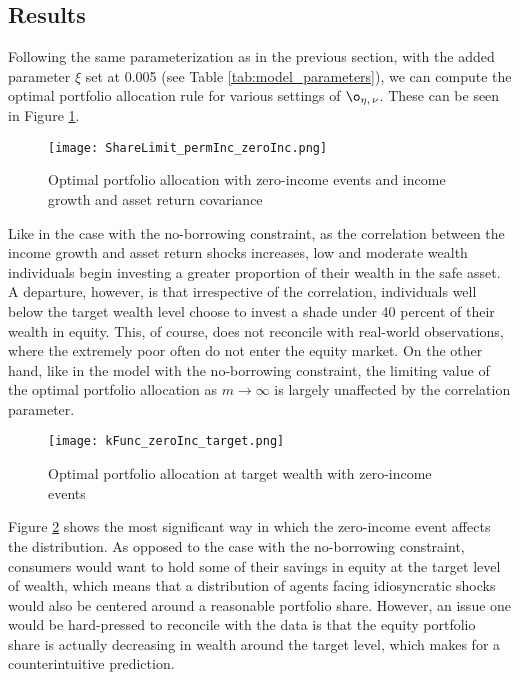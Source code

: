 \subsection{Results}

Following the same parameterization as in the previous section, with the added parameter $\xi$ set at 0.005 (see Table \ref{tab:model_parameters}), we can compute the optimal portfolio allocation rule for various settings of $\o_{\eta,\,\nu}$. These can be seen in Figure \ref{fig:zeroInc_shareLimit}.

\begin{figure}[h]
    \centering
    \texttt{[image: ShareLimit\_permInc\_zeroInc.png]}
    \caption{Optimal portfolio allocation with zero-income events and income growth and asset return covariance}
    \label{fig:zeroInc_shareLimit}
\end{figure}

Like in the case with the no-borrowing constraint, as the correlation between the income growth and asset return shocks increases, low and moderate wealth individuals begin investing a greater proportion of their wealth in the safe asset. A departure, however, is that irrespective of the correlation, individuals well below the target wealth level choose to invest a shade under 40 percent of their wealth in equity. This, of course, does not reconcile with real-world observations, where the extremely poor often do not enter the equity market. On the other hand, like in the model with the no-borrowing constraint, the limiting value of the optimal portfolio allocation as $m \to \infty$ is largely unaffected by the correlation parameter.

\begin{figure}[h]
    \centering
    \texttt{[image: kFunc\_zeroInc\_target.png]}
    \caption{Optimal portfolio allocation at target wealth with zero-income events}
    \label{fig:zeroInc_target}
\end{figure}

Figure \ref{fig:zeroInc_target} shows the most significant way in which the zero-income event affects the distribution. As opposed to the case with the no-borrowing constraint, consumers would want to hold some of their savings in equity at the target level of wealth, which means that a distribution of agents facing idiosyncratic shocks would also be centered around a reasonable portfolio share. However, an issue one would be hard-pressed to reconcile with the data is that the equity portfolio share is actually decreasing in wealth around the target level, which makes for a counterintuitive prediction.

